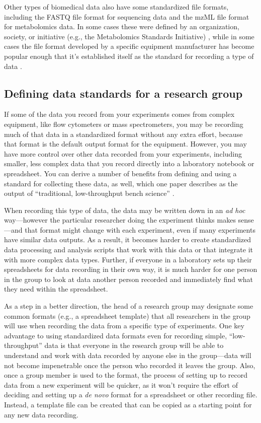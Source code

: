 \documentclass[]{tufte-book}
\begin{document}
Other types of biomedical data also have some standardized file formats,
including the FASTQ file format for sequencing data and the mzML file format for
metabolomics data. In some cases these were defined by an organization, society,
or initiative (e.g., the Metabolomics Standards Initiative)
\citep{ghosh2011software}, while in some cases the file format developed by a
specific equipment manufacturer has become popular enough that it's established
itself as the standard for recording a type of data \citep{brazma2006standards}.

\subsection{Defining data standards for a research group}\label{defining-data-standards-for-a-research-group}

If some of the data you record from your experiments comes from complex
equipment, like flow cytometers or mass spectrometers, you may be recording much
of that data in a standardized format without any extra effort, because that
format is the default output format for the equipment. However, you may have
more control over other data recorded from your experiments, including smaller,
less complex data that you record directly into a laboratory notebook or
spreadsheet. You can derive a number of benefits from defining and using a
standard for collecting these data, as well, which one paper describes as
the output of ``traditional, low-throughput bench science'' \citep{wilkinson2016fair}.

When recording this type of data, the data may be written down in an \emph{ad hoc}
way---however the particular researcher doing the experiment thinks makes
sense---and that format might change with each experiment, even if many
experiments have similar data outputs. As a result, it becomes harder to create
standardized data processing and analysis scripts that work with this data or
that integrate it with more complex data types. Further, if everyone in a
laboratory sets up their spreadsheets for data recording in their own way, it is
much harder for one person in the group to look at data another person recorded
and immediately find what they need within the spreadsheet.

As a step in a better direction, the head of a research group may designate some
common formats (e.g., a spreadsheet template) that all researchers in the group
will use when recording the data from a specific type of experiments. One key
advantage to using standardized data formats even for recording simple,
``low-throughput'' data is that everyone in the research group will be able to
understand and work with data recorded by anyone else in the group---data will
not become impenetrable once the person who recorded it leaves the group. Also,
once a group member is used to the format, the process of setting up to record
data from a new experiment will be quicker, as it won't require the effort of
deciding and setting up a \emph{de novo} format for a spreadsheet or other recording
file. Instead, a template file can be created that can be copied as a starting
point for any new data recording.
\end{document}
